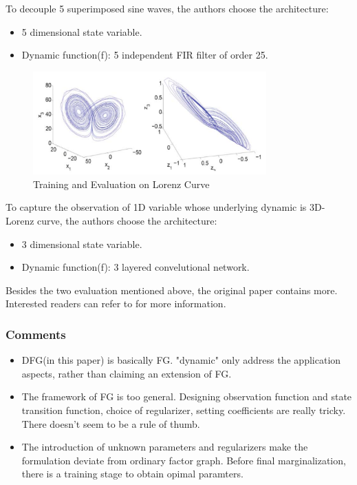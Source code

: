 \documentclass[11pt,a4paper]{article}
\begin{document}
To decouple 5 superimposed sine waves, the authors choose the architecture:
\begin{itemize}
	\item 5 dimensional state variable. 
	\item Dynamic function(f): 5 independent FIR filter of order 25. 
\end{itemize}

\begin{figure}[htb]
\centering
	\includegraphics[width=0.8\textwidth]{fig/mirowski2009-Lorenz.png}
	\caption{Training and Evaluation on Lorenz Curve}
\end{figure}
To capture the observation of 1D variable whose underlying 
dynamic is 3D-Lorenz curve, the authors choose the architecture:
\begin{itemize}
	\item 3 dimensional state variable. 
	\item Dynamic function(f): 3 layered convelutional network. 
\end{itemize}

Besides the two evaluation mentioned above, the original paper
contains more. Interested readers can refer to \cite{mirowski2009dynamic} for 
more information. 

\subsubsection{Comments}

\begin{itemize}
	\item DFG(in this paper) is basically FG. 
	"dynamic" only address the application aspects, rather 
	than claiming an extension of FG. 
	\item The framework of FG is too general. 
	Designing observation function and state transition function, 
	choice of regularizer, setting coefficients are really tricky.
	There doesn't seem to be a rule of thumb. 
	\item The introduction of unknown parameters and regularizers
	make the formulation deviate from ordinary factor graph. 
	Before final marginalization, there is a training stage 
	to obtain opimal paramters. 
\end{itemize}
\end{document}
